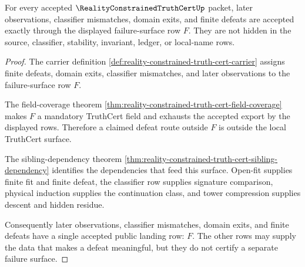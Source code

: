 \begin{theorem}
\label{thm:reality-constrained-truth-cert-failure-surface-exactness}
For every accepted $\RealityConstrainedTruthCertUp$ packet, later observations,
classifier mismatches, domain exits, and finite defeats are accepted exactly
through the displayed failure-surface row $F$. They are not hidden in the
source, classifier, stability, invariant, ledger, or local-name rows.
\end{theorem}
\begin{proof}
The carrier definition
\autoref{def:reality-constrained-truth-cert-carrier} assigns finite defeats,
domain exits, classifier mismatches, and later observations to the
failure-surface row $F$.

The field-coverage theorem
\autoref{thm:reality-constrained-truth-cert-field-coverage} makes $F$ a
mandatory TruthCert field and exhausts the accepted export by the displayed
rows. Therefore a claimed defeat route outside $F$ is outside the local
TruthCert surface.

The sibling-dependency theorem
\autoref{thm:reality-constrained-truth-cert-sibling-dependency} identifies the
dependencies that feed this surface. Open-fit supplies finite fit and finite
defeat, the classifier row supplies signature comparison, physical induction
supplies the continuation class, and tower compression supplies descent and
hidden residue.

Consequently later observations, classifier mismatches, domain exits, and
finite defeats have a single accepted public landing row: $F$. The other rows
may supply the data that makes a defeat meaningful, but they do not certify a
separate failure surface.
\end{proof}

